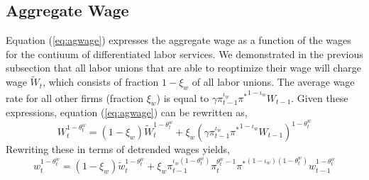 \documentclass[11pt]{article}
\newcommand{\beq}{\begin{equation}}
\newcommand{\eeq}{\end{equation}}
\newcommand{\eqref}[1]{(\ref{#1})}
\begin{document}
\subsection{Aggregate Wage}
Equation \eqref{eq:agwage} expresses the aggregate wage as a function of the wages for the contiuum of differentiated labor services.  We demonstrated in the previous subsection that all labor unions that are able to reoptimize their wage will charge wage $\tilde{W}_t$, which consists of fraction $1-\xi_w$ of all labor unions.  The average wage rate for all other firms (fraction $\xi_w$) is equal to $\gamma \pi_{t-1}^{\iota_w} {\pi^*}^{1-\iota_w} W_{t-1}$.  Given these expressions, equation \eqref{eq:agwage} can be rewritten as,
\beq W_t^{1-\theta_t^w} = (1-\xi_w) \tilde{W}_t^{1-\theta_t^w} + \xi_w (\gamma \pi_{t-1}^{\iota_w} {\pi^*}^{1-\iota_w} W_{t-1})^{1-\theta_t^w} \eeq
Rewriting these in terms of detrended wages yields,
\beq w_t^{1-\theta_t^w} = (1-\xi_w) \tilde{w}_t^{1-\theta_t^w} + \xi_w \pi_{t-1}^{\iota_w(1-\theta_t^w)} \pi_t^{\theta_t^w-1}{\pi^*}^{(1-\iota_w)(1-\theta_t^w)} w_{t-1}^{1-\theta_t^w} \eeq
\end{document}

